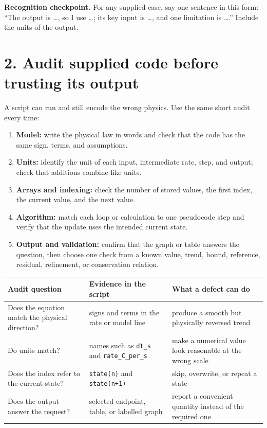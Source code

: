\documentclass[11pt,a4paper]{article}
\begin{document}
\begin{checkbox}\textbf{Recognition checkpoint.} For any supplied case, say one sentence in this form: ``The output is \ldots, so I use \ldots; its key input is \ldots, and one limitation is \ldots.'' Include the units of the output.\end{checkbox}

\section*{2. Audit supplied code before trusting its output}
A script can run and still encode the wrong physics. Use the same short audit every time:

\begin{samepage}
\begin{enumerate}[nosep,leftmargin=7mm]
\item \textbf{Model:} write the physical law in words and check that the code has the same sign, terms, and assumptions.
\item \textbf{Units:} identify the unit of each input, intermediate rate, step, and output; check that additions combine like units.
\item \textbf{Arrays and indexing:} check the number of stored values, the first index, the current value, and the next value.
\item \textbf{Algorithm:} match each loop or calculation to one pseudocode step and verify that the update uses the intended current state.
\item \textbf{Output and validation:} confirm that the graph or table answers the question, then choose one check from a known value, trend, bound, reference, residual, refinement, or conservation relation.
\end{enumerate}

\begin{center}\small
\begin{tabular}{>{\raggedright\arraybackslash}p{.22\linewidth}>{\raggedright\arraybackslash}p{.33\linewidth}>{\raggedright\arraybackslash}p{.33\linewidth}}
\toprule
\textbf{Audit question} & \textbf{Evidence in the script} & \textbf{What a defect can do} \\
\midrule
Does the equation match the physical direction? & signs and terms in the rate or model line & produce a smooth but physically reversed trend \\
Do units match? & names such as \texttt{dt\_s} and \texttt{rate\_C\_per\_s} & make a numerical value look reasonable at the wrong scale \\
Does the index refer to the current state? & \texttt{state(n)} and \texttt{state(n+1)} & skip, overwrite, or repeat a state \\
Does the output answer the request? & selected endpoint, table, or labelled graph & report a convenient quantity instead of the required one \\
\bottomrule
\end{tabular}
\end{center}


\end{samepage}
\end{document}
